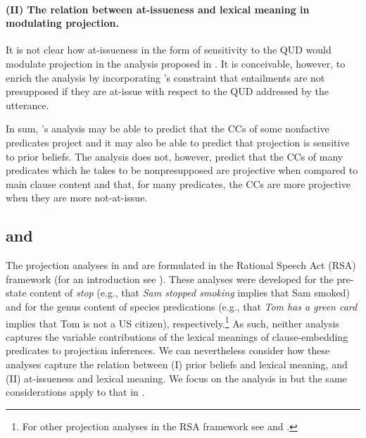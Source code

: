 \documentclass[11pt,fleqn]{article}
\newcommand{\6}{\mbox{$[\hspace*{-.6mm}[$}}
\newcommand{\9}{\mbox{$]\hspace*{-.6mm}]$}}
\newcommand{\citepos}[1]{\citeauthor{#1}'s \citeyear{#1}}
\begin{document}
\paragraph{(II) The relation between at-issueness and lexical meaning in modulating projection.} It is not clear how at-issueness in the form of sensitivity to the QUD would modulate projection in the analysis proposed in \citealt{schlenker2021}. It is conceivable, however, to enrich the analysis by incorporating \citepos{abrusan2011} constraint that entailments are not presupposed if they are at-issue with respect to the QUD addressed by the utterance.

\bigskip

In sum, \citepos{schlenker2021} analysis may be able to predict that the CCs of some nonfactive predicates project and it may also be able to predict that projection is sensitive to prior beliefs. The analysis does not, however, predict that the CCs of many predicates which he takes to be nonpresupposed are projective when compared to main clause content and that, for many predicates, the CCs are more projective when they are more not-at-issue.

\subsection{\citealt{qing-etal2016} and \citealt{warstadt2022}}

The projection analyses in \citealt{qing-etal2016} and \citealt{warstadt2022} are formulated in the Rational Speech Act (RSA) framework (for an introduction see \citealt{degen2023-RSA}).  These analyses were developed for the pre-state content of {\em stop} (e.g., that {\em Sam stopped smoking} implies that Sam smoked) and for the genus content of species predications (e.g., that {\em Tom has a green card} implies that Tom is not a US citizen), respectively.\footnote{For other projection analyses in the RSA framework see \citealt{stevens-etal2017} and \citealt{pan-degen2023}.} As such, neither analysis captures the variable contributions of the lexical meanings of clause-embedding predicates to projection inferences. We can nevertheless consider how these analyses capture the relation between (I) prior beliefs and lexical meaning, and (II) at-issueness and lexical meaning. We focus on the analysis in \citealt{qing-etal2016} but the same considerations apply to that in \citealt{warstadt2022}.
\end{document}
